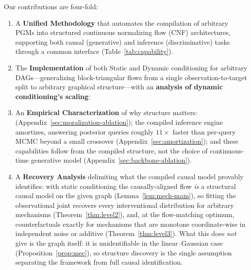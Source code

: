 Our contributions are four-fold:
\begin{enumerate}
    \item A \textbf{Unified Methodology} that automates the compilation of arbitrary PGMs into structured continuous normalizing flow (CNF) architectures, supporting both causal (generative) and inference (discriminative) tasks through a common interface (Table~\ref{tab:capability}).
    \item The \textbf{Implementation} of both Static and Dynamic conditioning for arbitrary DAGs---generalizing block-triangular flows from a single observation-to-target split to arbitrary graphical structure---with an \textbf{analysis of dynamic conditioning's  scaling}: 
    \item An \textbf{Empirical Characterization} of why structure matters:  (Appendix~\ref{sec:moralization-ablation}); the compiled inference engine amortizes, answering posterior queries roughly $11\times$ faster than per-query MCMC beyond a small crossover (Appendix~\ref{sec:amortization}); and these capabilities follow from the compiled structure, not the choice of continuous-time generative model (Appendix~\ref{sec:backbone-ablation}).
    \item A \textbf{Recovery Analysis} delimiting what the compiled causal model provably identifies: with static conditioning the causally-aligned flow \emph{is} a structural causal model on the given graph (Lemma~\ref{lem:mech-main}), so fitting the observational joint recovers every interventional distribution for arbitrary mechanisms (Theorem~\ref{thm:level2}), and, at the flow-matching optimum, counterfactuals exactly for mechanisms that are monotone coordinate-wise in independent noise or additive (Theorem~\ref{thm:level3}). What this does \emph{not} give is the graph itself: it is unidentifiable in the linear--Gaussian case (Proposition~\ref{prop:mec}), so structure discovery is the single assumption separating the framework from full causal identification.
\end{enumerate}